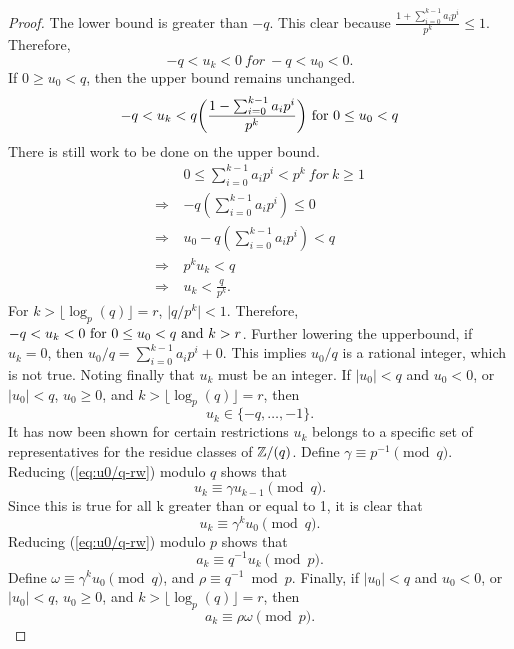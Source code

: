 \begin{proof}
  The lower bound is greater than $-q$. This clear because
  $\frac{1+\sum_{i=0}^{k-1}a_ip^i}{p^k}\leq1$.
  Therefore,
  \begin{equation*}
    -q < u_k < 0 \ for \ -q<u_0<0.
  \end{equation*}
  If $0\geq u_0<q$, then the upper bound remains unchanged.
  \begin{equation*}
    -q < u_k < q\bigg(\frac{1-\sum_{i=0}^{k-1}a_ip^i}{p^k}\bigg) \ {\rm for} \ 0\leq u_0 < q
  \end{equation*}
  There is still work to be done on the upper bound.
  \begin{align*}
                &0 \leq \sum_{i=0}^{k-1}a_ip^i < p^k \ for \ k\geq1 \\
    \Rightarrow &-q(\sum_{i=0}^{k-1}a_ip^i) \leq 0 \\
    \Rightarrow \ &u_0-q(\sum_{i=0}^{k-1}a_ip^i)<q \\
    \Rightarrow \ &p^ku_k<q \\
    \Rightarrow \ &u_k<\frac{q}{p^k}.
  \end{align*}
  For $k>\lfloor\log_p(q)\rfloor=r$, $\lvert q/p^k \rvert < 1$. Therefore,
  $-q < u_k < 0 \ {\rm for} \ 0\leq u_0 < q \ {\rm and} \ k>r$.
  Further lowering the upperbound, if $u_k=0$, then $u_0/q=\sum_{i=0}^{k-1}a_ip^i+0$.
  This implies $u_0/q$ is a rational integer, which is not true. Noting finally
  that $u_k$ must be an integer. If $\lvert u_0 \rvert<q$ and $u_0<0$, or
  $\lvert u_0 \rvert<q$, $u_0\geq0$, and $k>\lfloor \log_p(q) \rfloor=r$, then
  \begin{equation*}
    u_k \in \{-q,\dots,-1\}.
  \end{equation*}
  It has now been shown for certain restrictions $u_k$ belongs to a specific
  set of representatives for the residue classes of $\mathbb{Z}/(q)$. Define 
  $\gamma \equiv p^{-1} \pmod q$. Reducing (\ref{eq:u0/q-rw}) modulo $q$ shows that
  \begin{equation}
    u_k \equiv \gamma u_{k-1} \pmod q.
  \end{equation}
  Since this is true for all k greater than or equal to 1, it is clear that
  \begin{equation}\label{eq:uk-mod-q}
    u_k \equiv \gamma^ku_0 \pmod q.
  \end{equation}
  Reducing (\ref{eq:u0/q-rw}) modulo $p$ shows that
  \begin{equation}\label{eq:ak-mod-p}
    a_k \equiv q^{-1}u_k \pmod p.
  \end{equation}
  Define $\omega \equiv \gamma^k u_0 \pmod q$, and $\rho \equiv q^{-1} \bmod p$.
  Finally, if $\lvert u_0 \rvert<q$ and $u_0<0$, or
  $\lvert u_0 \rvert<q$, $u_0\geq0$, and $k>\lfloor \log_p(q) \rfloor=r$, then
  \begin{equation}\label{eq:ak-done}
    a_k \equiv \rho\omega \pmod p.
  \end{equation}
\end{proof}
